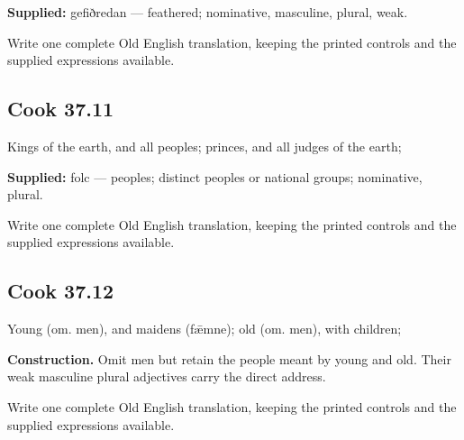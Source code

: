 \textbf{Supplied:} gefiðredan — feathered; nominative, masculine, plural, weak.

Write one complete Old English translation, keeping the printed controls and the supplied expressions available.

\par\begin{minipage}{\linewidth}\raggedright
\subsection*{Cook 37.11}

Kings of the earth, and all peoples; princes, and all judges of the earth;

\textbf{Supplied:} folc — peoples; distinct peoples or national groups; nominative, plural.

Write one complete Old English translation, keeping the printed controls and the supplied expressions available.

\end{minipage}\par\addvspace{4pt}

\par\begin{minipage}{\linewidth}\raggedright
\subsection*{Cook 37.12}

Young (om. men), and maidens (fǣmne); old (om. men), with children;

\textbf{Construction.} Omit men but retain the people meant by young and old. Their weak masculine plural adjectives carry the direct address.

Write one complete Old English translation, keeping the printed controls and the supplied expressions available.

\end{minipage}\par\addvspace{4pt}

